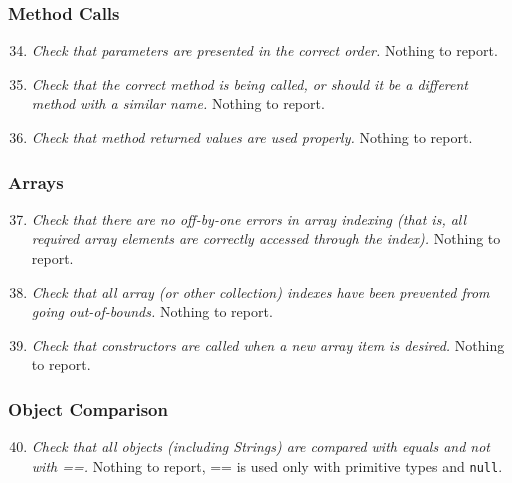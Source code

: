 	\subsubsection{Method Calls}
		\begin{enumerate}
			\setcounter{enumi}{33}
			\item \textit{Check that parameters are presented in the correct order.}\newline
			Nothing to report. %

			\item \textit{Check that the correct method is being called, or should it be a different method with a similar name.}\newline
			Nothing to report. %

			\item \textit{Check that method returned values are used properly.}\newline
			Nothing to report. %
		\end{enumerate}

	\subsubsection{Arrays}
		\begin{enumerate}
			\setcounter{enumi}{36}
			\item \textit{Check that there are no off-by-one errors in array indexing (that is, all required array elements are correctly accessed through the index).}\newline
			Nothing to report. %

			\item \textit{Check that all array (or other collection) indexes have been prevented from going out-of-bounds.}\newline
			Nothing to report. %

			\item \textit{Check that constructors are called when a new array item is desired.}\newline
			Nothing to report. %
		\end{enumerate}

	\subsubsection{Object Comparison}
		\begin{enumerate}
			\setcounter{enumi}{39}
			\item \textit{Check that all objects (including Strings) are compared with equals and not with ==.}\newline
			Nothing to report, == is used only with primitive types and \texttt{null}. %
		\end{enumerate}

